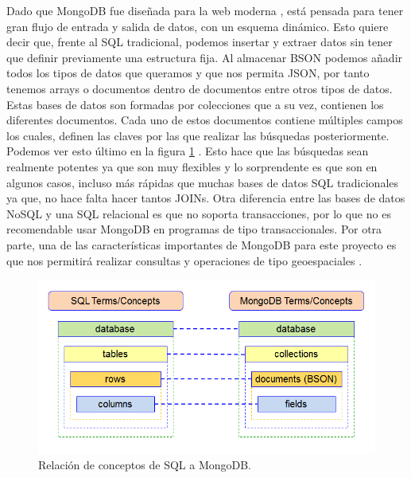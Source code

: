 Dado que MongoDB fue diseñada para la web moderna \cite{Mng-2}, está
pensada para tener gran flujo de entrada y salida de datos, con un esquema
dinámico. Esto quiere decir que, frente al SQL tradicional, podemos
insertar y extraer datos sin tener que definir previamente una estructura
fija. Al almacenar BSON podemos añadir todos los tipos de datos que
queramos y que nos permita JSON, por tanto tenemos arrays o documentos
dentro de documentos entre otros tipos de datos. Estas bases de datos son
formadas por colecciones que a su vez, contienen los diferentes documentos.
Cada uno de estos documentos contiene múltiples campos los cuales, definen
las claves por las que realizar las búsquedas posteriormente. Podemos ver
esto último en la figura \ref{Mng-img-1} \cite{Mng-5}. Esto hace que las
búsquedas sean realmente potentes ya que son muy flexibles y lo
sorprendente es que son en algunos casos, incluso más rápidas que muchas
bases de datos SQL tradicionales ya que, no hace falta hacer tantos JOINs.
Otra diferencia entre las bases de datos NoSQL y una SQL relacional es que
no soporta transacciones, por lo que no es recomendable usar MongoDB en
programas de tipo transaccionales. Por otra parte, una de las
características importantes de MongoDB para este proyecto es que nos
permitirá realizar consultas y operaciones de tipo geoespaciales
\cite{Mng-3}.


\begin{figure}[htp]
\centering
\includegraphics[scale=0.57]{Imagenes/mongo1.png}
\caption{Relación de conceptos de SQL a MongoDB.}
\label{Mng-img-1}
\end{figure}



